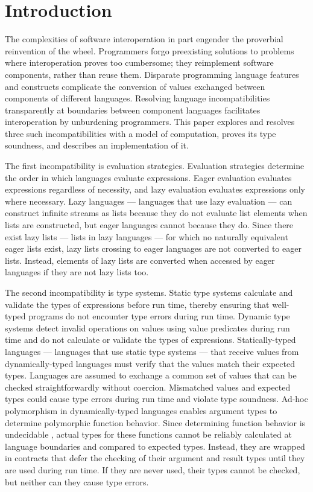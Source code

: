 \chapter{Introduction}

The complexities of software interoperation in part engender the proverbial reinvention of the wheel.  Programmers forgo preexisting solutions to problems where interoperation proves too cumbersome; they reimplement software components, rather than reuse them.  Disparate programming language features and constructs complicate the conversion of values exchanged between components of different languages.  Resolving language incompatibilities transparently at boundaries between component languages facilitates interoperation by unburdening programmers.  This paper explores and resolves three such incompatibilities with a model of computation, proves its type soundness, and describes an implementation of it.

The first incompatibility is evaluation strategies.  Evaluation strategies determine the order in which languages evaluate expressions.  Eager evaluation evaluates expressions regardless of necessity, and lazy evaluation evaluates expressions only where necessary.  Lazy languages --- languages that use lazy evaluation --- can construct infinite streams as lists because they do not evaluate list elements when lists are constructed, but eager languages cannot because they do.  Since there exist lazy lists --- lists in lazy languages --- for which no naturally equivalent eager lists exist, lazy lists crossing to eager languages are not converted to eager lists.  Instead, elements of lazy lists are converted when accessed by eager languages if they are not lazy lists too.

The second incompatibility is type systems.  Static type systems calculate and validate the types of expressions before run time, thereby ensuring that well-typed programs do not encounter type errors during run time.  Dynamic type systems detect invalid operations on values using value predicates during run time and do not calculate or validate the types of expressions.  Statically-typed languages --- languages that use static type systems --- that receive values from dynamically-typed languages must verify that the values match their expected types.  Languages are assumed to exchange a common set of values that can be checked straightforwardly without coercion.  Mismatched values and expected types could cause type errors during run time and violate type soundness.  Ad-hoc polymorphism in dynamically-typed languages enables argument types to determine polymorphic function behavior.  Since determining function behavior is undecidable \cite{blume04}, actual types for these functions cannot be reliably calculated at language boundaries and compared to expected types.  Instead, they are wrapped in contracts \cite{findler02} that defer the checking of their argument and result types until they are used during run time.  If they are never used, their types cannot be checked, but neither can they cause type errors.

